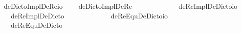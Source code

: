 \begin{isabellebody}
\isamarkupfalse%
\ deDictoImplDeRe{\isacharcolon}{\isacharcolon}{\isachardoublequoteopen}{\isasymup}{\isasymzero}{\isasymRightarrow}io{\isachardoublequoteclose}\ \isanewline
\ \ \ {\isachardoublequoteopen}deDictoImplDeRe\ {\isasymtau}\ {\isasymequiv}\ \isactrlbold {\isasymforall}{\isasymalpha}{\isachardot}\ \isactrlbold {\isasymbox}{\isacharparenleft}{\isacharparenleft}{\isasymlambda}{\isasymbeta}{\isachardot}\ {\isacharparenleft}{\isasymalpha}\ {\isasymbeta}{\isacharparenright}{\isacharparenright}\ {\isasymdownharpoonleft}{\isasymtau}{\isacharparenright}\ \isactrlbold {\isasymrightarrow}\ {\isacharparenleft}{\isacharparenleft}{\isasymlambda}{\isasymbeta}{\isachardot}\ \isactrlbold {\isasymbox}{\isacharparenleft}{\isasymalpha}\ {\isasymbeta}{\isacharparenright}{\isacharparenright}\ {\isasymdownharpoonleft}{\isasymtau}{\isacharparenright}{\isachardoublequoteclose}\isanewline
{}\isamarkupfalse%
\ deReImplDeDicto{\isacharcolon}{\isacharcolon}{\isachardoublequoteopen}{\isasymup}{\isasymzero}{\isasymRightarrow}io{\isachardoublequoteclose}\ \isanewline
\ \ \ {\isachardoublequoteopen}deReImplDeDicto\ {\isasymtau}\ {\isasymequiv}\ \isactrlbold {\isasymforall}{\isasymalpha}{\isachardot}\ {\isacharparenleft}{\isacharparenleft}{\isasymlambda}{\isasymbeta}{\isachardot}\ \isactrlbold {\isasymbox}{\isacharparenleft}{\isasymalpha}\ {\isasymbeta}{\isacharparenright}{\isacharparenright}\ {\isasymdownharpoonleft}{\isasymtau}{\isacharparenright}\ \isactrlbold {\isasymrightarrow}\ \isactrlbold {\isasymbox}{\isacharparenleft}{\isacharparenleft}{\isasymlambda}{\isasymbeta}{\isachardot}\ {\isacharparenleft}{\isasymalpha}\ {\isasymbeta}{\isacharparenright}{\isacharparenright}\ {\isasymdownharpoonleft}{\isasymtau}{\isacharparenright}{\isachardoublequoteclose}\isanewline
{}\isamarkupfalse%
\ deReEquDeDicto{\isacharcolon}{\isacharcolon}{\isachardoublequoteopen}{\isasymup}{\isasymzero}{\isasymRightarrow}io{\isachardoublequoteclose}\ \isanewline
\ \ \ {\isachardoublequoteopen}deReEquDeDicto\ {\isasymtau}\ {\isasymequiv}\ \isactrlbold {\isasymforall}{\isasymalpha}{\isachardot}\ {\isacharparenleft}{\isacharparenleft}{\isasymlambda}{\isasymbeta}{\isachardot}\ \isactrlbold {\isasymbox}{\isacharparenleft}{\isasymalpha}\ {\isasymbeta}{\isacharparenright}{\isacharparenright}\ {\isasymdownharpoonleft}{\isasymtau}{\isacharparenright}\ \isactrlbold {\isasymleftrightarrow}\ \isactrlbold {\isasymbox}{\isacharparenleft}{\isacharparenleft}{\isasymlambda}{\isasymbeta}{\isachardot}\ {\isacharparenleft}{\isasymalpha}\ {\isasymbeta}{\isacharparenright}{\isacharparenright}\ {\isasymdownharpoonleft}{\isasymtau}{\isacharparenright}{\isachardoublequoteclose}\isanewline

\end{isabellebody}
